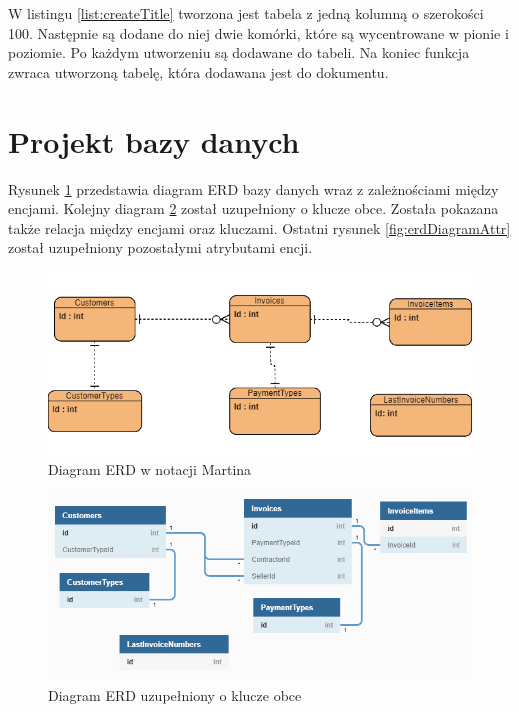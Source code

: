 W listingu \ref{list:createTitle} tworzona jest tabela z jedną kolumną o szerokości 100. Następnie są dodane do niej dwie komórki, które są wycentrowane w pionie i poziomie. Po każdym utworzeniu są dodawane do tabeli. Na koniec funkcja zwraca utworzoną tabelę, która dodawana jest do dokumentu.

\section{Projekt bazy danych}

Rysunek \ref{fig:erdDiagram} przedstawia diagram ERD bazy danych wraz z zależnościami między encjami. Kolejny diagram \ref{fig:erdDiagramForeign} został uzupełniony o klucze obce. Została pokazana także relacja między encjami oraz kluczami. Ostatni rysunek \ref{fig:erdDiagramAttr} został uzupełniony pozostałymi atrybutami encji.

\begin{figure}[ht!]
\centering
  \includegraphics[width=0.7\linewidth]{Rysunki/ERD.png}
  \caption{Diagram ERD w notacji Martina}
  \label{fig:erdDiagram}
\end{figure}

\begin{figure}[ht!]
\centering
  \includegraphics[width=0.8\linewidth]{Rysunki/ERD-relacje.png}
  \caption{Diagram ERD uzupełniony o klucze obce}
  \label{fig:erdDiagramForeign}
\end{figure}

